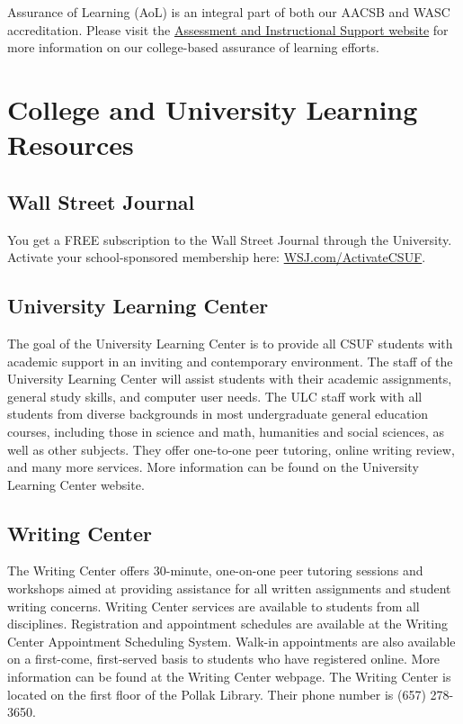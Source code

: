 \documentclass{syllabus}
\begin{document}
Assurance of Learning (AoL) is an integral part of both our AACSB and WASC accreditation. Please visit the \href{https://business.fullerton.edu/assessment}{Assessment and Instructional Support website} for more information on our college-based assurance of learning efforts.

\section*{College and University Learning Resources}


\subsection*{Wall Street Journal}
You get a FREE subscription to the Wall Street Journal through the University. Activate your school-sponsored membership here: \href{https://partner.wsj.com/p/1110800011/register?mod=wsj_CSUF_360}{WSJ.com/ActivateCSUF}.

\subsection*{University Learning Center}
The goal of the University Learning Center is to provide all CSUF students with academic support in an inviting and contemporary environment.  The staff of the University Learning Center will assist students with their academic assignments, general study skills, and computer user needs. The ULC staff work with all students from diverse backgrounds in most undergraduate general education courses, including those in science and math, humanities and social sciences, as well as other subjects. They offer one-to-one peer tutoring, online writing review, and many more services.  More information can be found on the University Learning Center website.

\subsection*{Writing Center}
The Writing Center offers 30-minute, one-on-one peer tutoring sessions and workshops aimed at providing assistance for all written assignments and student writing concerns. Writing Center services are available to students from all disciplines. Registration and appointment schedules are available at the Writing Center Appointment Scheduling System. Walk-in appointments are also available on a first-come, first-served basis to students who have registered online. More information can be found at the  Writing Center webpage.  The Writing Center is located on the first floor of the Pollak Library. Their phone number is (657) 278-3650.
\end{document}
